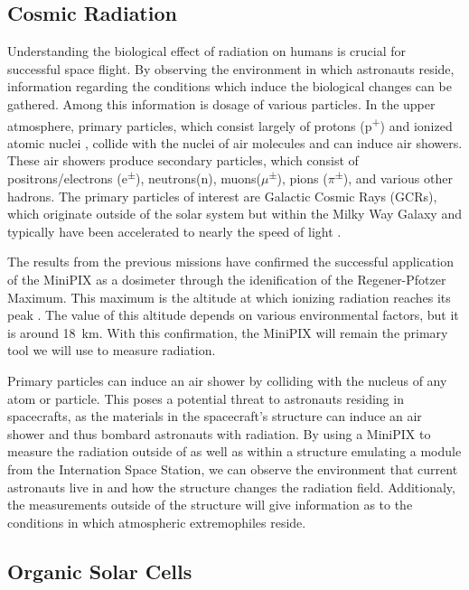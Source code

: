 \subsection{Cosmic Radiation}
\label{subsec:RadiationBackground}

Understanding the biological effect of radiation on humans is crucial for successful space flight.
By observing the environment in which astronauts reside, information regarding the conditions which induce the biological changes can be gathered.
Among this information is dosage of various particles.
In the upper atmosphere, primary particles, which consist largely of protons (p\textsuperscript{+}) and ionized atomic nuclei \cite{Frank}, collide with the nuclei of air molecules and can induce air showers.
These air showers produce secondary particles, which consist of positrons/electrons (e\textsuperscript{$\pm$}), neutrons(n), muons($\mu$\textsuperscript{$\pm$}), pions ($\pi$\textsuperscript{$\pm$}), and various other hadrons.
The primary particles of interest are Galactic Cosmic Rays (GCRs), which originate outside of the solar system but within the Milky Way Galaxy and typically have been accelerated to nearly the speed of light \cite{GCRs}.

The results from the previous missions have confirmed the successful application of the MiniPIX as a dosimeter through the idenification of the Regener-Pfotzer Maximum. This maximum is the altitude at which ionizing radiation reaches its peak \cite{Regener}. The value of this altitude depends on various environmental factors, but it is around \SI{18}{\kilo\meter}. With this confirmation, the MiniPIX will remain the primary tool we will use to measure radiation.

Primary particles can induce an air shower by colliding with the nucleus of any atom or particle.
This poses a potential threat to astronauts residing in spacecrafts, as the materials in the spacecraft's structure can induce an air shower and thus bombard astronauts with radiation.
By using a MiniPIX to measure the radiation outside of as well as within a structure emulating a module from the Internation Space Station, we can observe the environment that current astronauts live in and how the structure changes the radiation field.
Additionaly, the measurements outside of the structure will give information as to the conditions in which atmospheric extremophiles reside.

\subsection{Organic Solar Cells}
